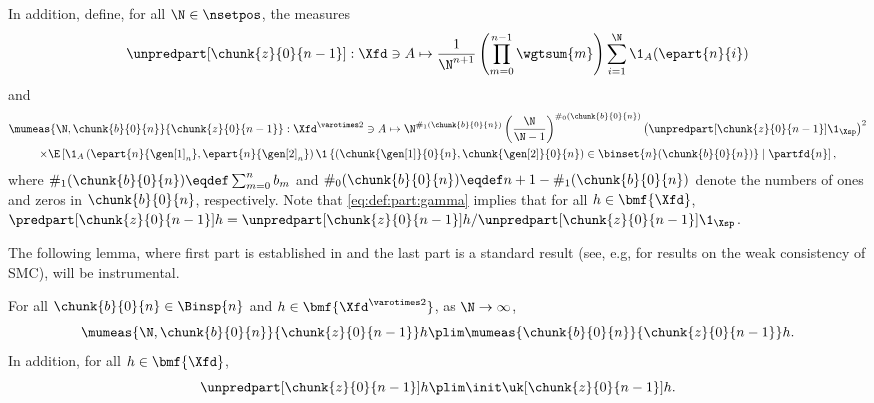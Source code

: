 In addition, define, for all $\N \in \nsetpos$, the measures
\begin{equation} \label{eq:def:part:gamma}
\unpredpart[\chunk{z}{0}{n - 1}] : \Xfd \ni A \mapsto \frac{1}{\N^{n + 1}} \left( \prod_{m = 0}^{n - 1} \wgtsum{m} \right) \sum_{i = 1}^\N \1_A(\epart{n}{i})
\end{equation}
and 
\begin{multline} \label{eq:mu:meas}
\mumeas{\N, \chunk{b}{0}{n}}{\chunk{z}{0}{n - 1}} :  \Xfd^{\varotimes 2} \ni A \mapsto 
\N^{\#_1(\chunk{b}{0}{n})} \left( \frac{\N}{\N - 1} \right)^{\#_0(\chunk{b}{0}{n})}
\left( \unpredpart[\chunk{z}{0}{n - 1}] \1_\Xsp \right)^2 \\ 
\times \E \left[ \1_A \left( \epart{n}{\gen[1]_n}, \epart{n}{\gen[2]_n} \right) \1 \left \{(\chunk{\gen[1]}{0}{n}, \chunk{\gen[2]}{0}{n}) \in \binset{n}(\chunk{b}{0}{n}) \right \} \mid \partfd{n} \right],  
\end{multline}
where $\#_1(\chunk{b}{0}{n}) \eqdef \sum_{m = 0}^n b_m$ and $\#_0(\chunk{b}{0}{n}) \eqdef n + 1 - \#_1(\chunk{b}{0}{n})$ denote the numbers of ones and zeros in $\chunk{b}{0}{n}$, respectively. Note that \eqref{eq:def:part:gamma} implies that for all $h \in \bmf{\Xfd}$, $\predpart[\chunk{z}{0}{n - 1}] h = \unpredpart[\chunk{z}{0}{n - 1}] h / \unpredpart[\chunk{z}{0}{n - 1}] \1_\Xsp$. 

The following lemma, where first part is established in \cite[Theorem~2]{lee:whiteley:2016} and the last part is a standard result (see, e.g, \cite{douc:moulines:2008} for results on the weak consistency of SMC), will be instrumental. 

\begin{lemma} \label{lemma:mu:convergence}
For all $\chunk{b}{0}{n} \in \Binsp{n}$ and $h \in \bmf{\Xfd^{\varotimes 2}}$, as $\N \rightarrow \infty$, 
$$
\mumeas{\N, \chunk{b}{0}{n}}{\chunk{z}{0}{n - 1}} h \plim \mumeas{\chunk{b}{0}{n}}{\chunk{z}{0}{n - 1}} h. 
$$
In addition, for all $h \in \bmf{\Xfd}$, 
$$
\unpredpart[\chunk{z}{0}{n - 1}] h \plim \init \uk[\chunk{z}{0}{n - 1}] h. 
$$
\end{lemma}

